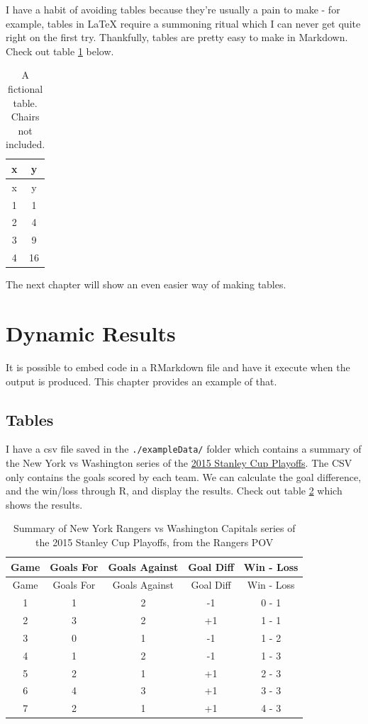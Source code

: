 \documentclass[]{article}
\begin{document}
I have a habit of avoiding tables because they're usually a pain to make
- for example, tables in LaTeX require a summoning ritual which I can
never get quite right on the first try. Thankfully, tables are pretty
easy to make in Markdown. Check out table \ref{tab:fiction} below.

\begin{longtable}[c]{@{}cc@{}}
\caption[Simple table]{ A fictional table. Chairs not included.
\label{tab:fiction}}\tabularnewline
\toprule
x & y\tabularnewline
\midrule
\endfirsthead
\toprule
x & y\tabularnewline
\midrule
\endhead
1 & 1\tabularnewline
2 & 4\tabularnewline
3 & 9\tabularnewline
4 & 16\tabularnewline
\bottomrule
\end{longtable}

The next chapter will show an even easier way of making tables.

\section{Dynamic Results}\label{dynamic-results}

It is possible to embed code in a RMarkdown file and have it execute
when the output is produced. This chapter provides an example of that.

\subsection{Tables}\label{tables-1}

I have a csv file saved in the \texttt{./exampleData/} folder which
contains a summary of the New York vs Washington series of the
\href{http://en.wikipedia.org/wiki/2015_Stanley_Cup_playoffs\#.28M1.29_New_York_Rangers_vs._.28M2.29_Washington_Capitals}{2015
Stanley Cup Playoffs}. The CSV only contains the goals scored by each
team. We can calculate the goal difference, and the win/loss through R,
and display the results. Check out table \ref{tab:NYRvsWSH} which shows
the results.

\begin{longtable}[c]{@{}ccccc@{}}
\caption[Summary of NYR vs WSH]{ Summary of New York Rangers vs
Washington Capitals series of the 2015 Stanley Cup Playoffs, from the
Rangers POV \label{tab:NYRvsWSH}}\tabularnewline
\toprule
Game & Goals For & Goals Against & Goal Diff & Win - Loss\tabularnewline
\midrule
\endfirsthead
\toprule
Game & Goals For & Goals Against & Goal Diff & Win - Loss\tabularnewline
\midrule
\endhead
1 & 1 & 2 & -1 & 0 - 1\tabularnewline
2 & 3 & 2 & +1 & 1 - 1\tabularnewline
3 & 0 & 1 & -1 & 1 - 2\tabularnewline
4 & 1 & 2 & -1 & 1 - 3\tabularnewline
5 & 2 & 1 & +1 & 2 - 3\tabularnewline
6 & 4 & 3 & +1 & 3 - 3\tabularnewline
7 & 2 & 1 & +1 & 4 - 3\tabularnewline
\bottomrule
\end{longtable}
\end{document}

